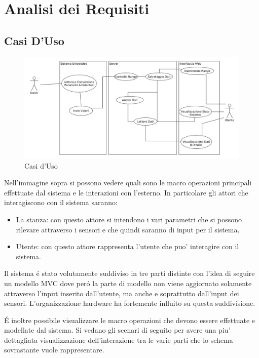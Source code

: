 \section{Analisi dei Requisiti}
\subsection{Casi D'Uso}

\begin{figure}[ht]
\centering
\includegraphics[width=\textwidth]{Figures/UseCases.jpg}
\caption{Casi d'Uso}
\end{figure}

Nell'immagine sopra si possono vedere quali sono le macro operazioni principali effettuate dal sistema e le interazioni con l'esterno. In particolare gli attori che interagiscono con il sistema saranno:

\begin{itemize}
  \item La stanza: con questo attore si intendono i vari parametri che si possono rilevare attraverso i sensori e che quindi saranno di input per il sistema.
  \item Utente: con questo attore rappresenta l'utente che puo' interagire con il sistema.
\end{itemize}

Il sistema \'e stato volutamente suddiviso in tre parti distinte con l'idea di seguire un modello MVC dove per\'o la parte di modello non viene aggiornato solamente attraverso l'input inserito dall'utente, ma anche e soprattutto dall'input dei sensori. L'organizzazione hardware ha fortemente influito su questa suddivisione.

\'E inoltre possibile visualizzare le macro operazioni che devono essere effettuate e modellate dal sistema. Si vedano gli scenari di seguito per avere una piu' dettagliata visualizzazione dell'interazione tra le varie parti che lo schema sovrastante vuole rappresentare.


